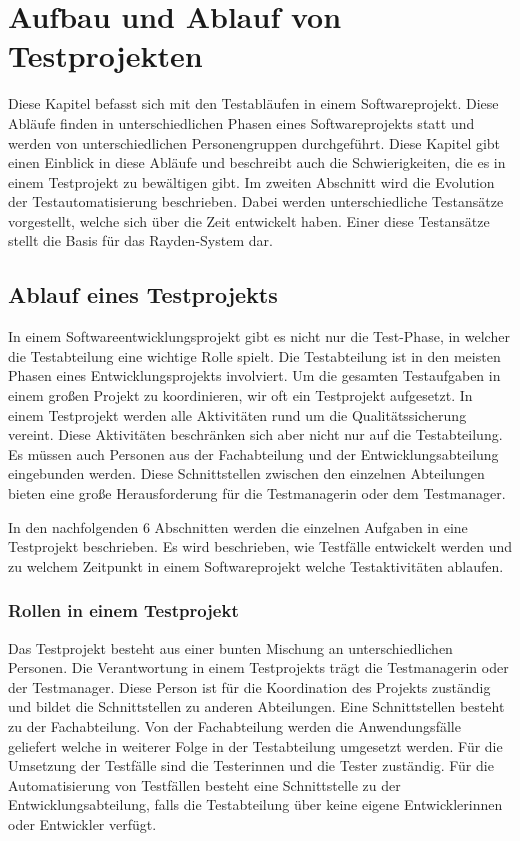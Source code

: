 \chapter{Aufbau und Ablauf von Testprojekten}
\label{cha:Konzept}

Diese Kapitel befasst sich mit den Testabläufen in einem Softwareprojekt. Diese Abläufe finden in unterschiedlichen Phasen eines Softwareprojekts statt und werden von unterschiedlichen Personengruppen durchgeführt. Diese Kapitel gibt einen Einblick in diese Abläufe und beschreibt auch die Schwierigkeiten, die es in einem Testprojekt zu bewältigen gibt. Im zweiten Abschnitt wird die Evolution der Testautomatisierung beschrieben. Dabei werden unterschiedliche Testansätze vorgestellt, welche sich über die Zeit entwickelt haben. Einer diese Testansätze stellt die Basis für das Rayden-System dar.

\section{Ablauf eines Testprojekts}

In einem Softwareentwicklungsprojekt gibt es nicht nur die Test-Phase, in welcher die Testabteilung eine wichtige Rolle spielt. Die Testabteilung ist in den meisten Phasen eines Entwicklungsprojekts involviert. Um die gesamten Testaufgaben in einem großen Projekt zu koordinieren, wir oft ein Testprojekt aufgesetzt. In einem Testprojekt werden alle Aktivitäten rund um die Qualitätssicherung vereint. Diese Aktivitäten beschränken sich aber nicht nur auf die Testabteilung. Es müssen auch Personen aus der Fachabteilung und der Entwicklungsabteilung eingebunden werden. Diese Schnittstellen zwischen den einzelnen Abteilungen bieten eine große Herausforderung für die Testmanagerin oder dem Testmanager.

\SuperPar
In den nachfolgenden 6 Abschnitten werden die einzelnen Aufgaben in eine Testprojekt beschrieben. Es wird beschrieben, wie Testfälle entwickelt werden und zu welchem Zeitpunkt in einem Softwareprojekt welche Testaktivitäten ablaufen.

\subsection{Rollen in einem Testprojekt}

Das Testprojekt besteht aus einer bunten Mischung an unterschiedlichen Personen. Die Verantwortung in einem Testprojekts trägt die Testmanagerin oder der Testmanager. Diese Person ist für die Koordination des Projekts zuständig und bildet die Schnittstellen zu anderen Abteilungen. Eine Schnittstellen besteht zu der Fachabteilung. Von der Fachabteilung werden die Anwendungsfälle geliefert welche in weiterer Folge in der Testabteilung umgesetzt werden. Für die Umsetzung der Testfälle sind die Testerinnen und die Tester zuständig. Für die Automatisierung von Testfällen besteht eine Schnittstelle zu der Entwicklungsabteilung, falls die Testabteilung über keine eigene Entwicklerinnen oder Entwickler verfügt.

